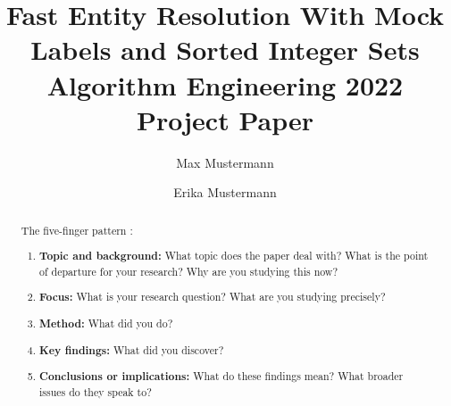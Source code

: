 \documentclass[sigconf]{acmart}
\begin{document}
\title[Fast Entity Resolution With Mock Labels and Sorted Integer Sets]{Fast Entity Resolution With Mock Labels and Sorted Integer Sets\\\large Algorithm Engineering 2022 Project Paper}


\author{Max Mustermann}

\author{Erika Mustermann}

\begin{abstract}

The five-finger pattern \cite{macgilchrist2014}:
\begin{enumerate}
\item \textbf{Topic and background:} What topic does the paper deal with? What is the point of departure for your research? Why are you studying this now?
\item \textbf{Focus:} What is your research question? What are you studying precisely?
\item \textbf{Method:} What did you do?
\item \textbf{Key findings:} What did you discover?
\item \textbf{Conclusions or implications:} What do these findings mean? What broader issues do they speak to?
\end{enumerate}


\end{abstract}



\maketitle
\end{document}

